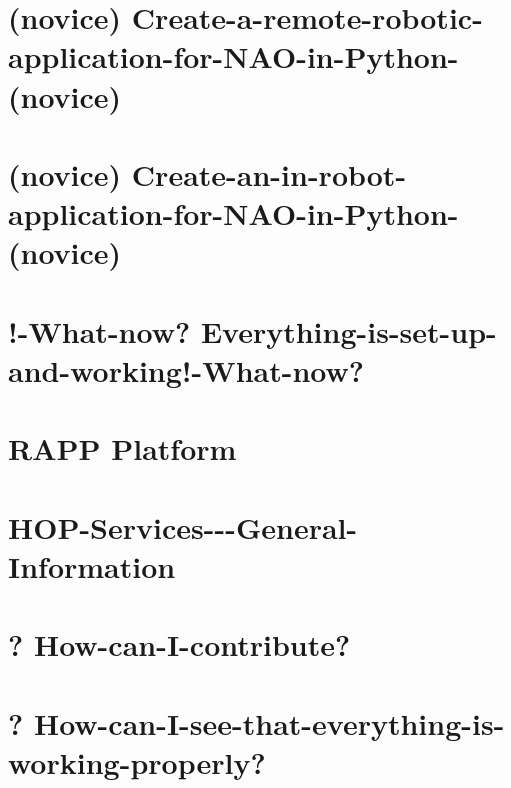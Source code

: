 \documentclass[twoside]{book}
\begin{document}
\chapter{(novice) Create-\/a-\/remote-\/robotic-\/application-\/for-\/\-N\-A\-O-\/in-\/\-Python-\/(novice)}
\label{md_rapp-platform_8wiki_Create-a-remote-robotic-application-for-NAO-in-Python-}
\hypertarget{md_rapp-platform_8wiki_Create-a-remote-robotic-application-for-NAO-in-Python-}{}

\chapter{(novice) Create-\/an-\/in-\/robot-\/application-\/for-\/\-N\-A\-O-\/in-\/\-Python-\/(novice)}
\label{md_rapp-platform_8wiki_Create-an-in-robot-application-for-NAO-in-Python-}
\hypertarget{md_rapp-platform_8wiki_Create-an-in-robot-application-for-NAO-in-Python-}{}

\chapter{!-\/\-What-\/now? Everything-\/is-\/set-\/up-\/and-\/working!-\/\-What-\/now?}
\label{md_rapp-platform_8wiki_Everything-is-set-up-and-working}
\hypertarget{md_rapp-platform_8wiki_Everything-is-set-up-and-working}{}

\chapter{R\-A\-P\-P Platform}
\label{md_rapp-platform_8wiki_Home}
\hypertarget{md_rapp-platform_8wiki_Home}{}

\chapter{H\-O\-P-\/\-Services-\/-\/-\/\-General-\/\-Information}
\label{md_rapp-platform_8wiki_HOP-Services---General-Information}
\hypertarget{md_rapp-platform_8wiki_HOP-Services---General-Information}{}

\chapter{? How-\/can-\/\-I-\/contribute?}
\label{md_rapp-platform_8wiki_How-can-I-contribute}
\hypertarget{md_rapp-platform_8wiki_How-can-I-contribute}{}

\chapter{? How-\/can-\/\-I-\/see-\/that-\/everything-\/is-\/working-\/properly?}
\label{md_rapp-platform_8wiki_How-can-I-see-that-everything-is-working-properly}
\hypertarget{md_rapp-platform_8wiki_How-can-I-see-that-everything-is-working-properly}{}

\end{document}
